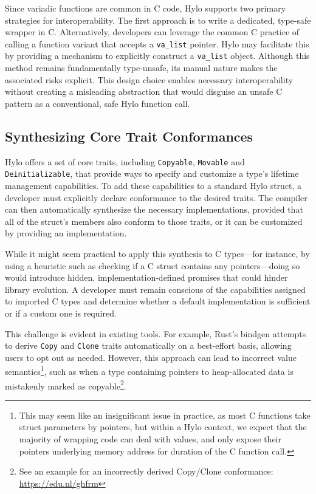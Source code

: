 Since variadic functions are common in C code, Hylo supports two primary strategies for interoperability. The first approach is to write a dedicated, type-safe wrapper in C. Alternatively, developers can leverage the common C practice of calling a function variant that accepts a \texttt{va\_list} pointer\cite{wrapping-valist}. Hylo may facilitate this by providing a mechanism to explicitly construct a \texttt{va\_list} object\cite{swift-variadic-ffi}. Although this method remains fundamentally type-unsafe, its manual nature makes the associated risks explicit. This design choice enables necessary interoperability without creating a misleading abstraction that would disguise an unsafe C pattern as a conventional, safe Hylo function call.

\subsection{Synthesizing Core Trait Conformances}

Hylo offers a set of core traits, including \texttt{Copyable}, \texttt{Movable} and \texttt{Deinitializable}, that provide ways to specify and customize a type's lifetime management capabilities. To add these capabilities to a standard Hylo struct, a developer must explicitly declare conformance to the desired traits. The compiler can then automatically synthesize the necessary implementations, provided that all of the struct's members also conform to those traits, or it can be customized by providing an implementation.

While it might seem practical to apply this synthesis to C types—for instance, by using a heuristic such as checking if a C struct contains any pointers—doing so would introduce hidden, implementation-defined promises that could hinder library evolution. A developer must remain conscious of the capabilities assigned to imported C types and determine whether a default implementation is sufficient or if a custom one is required.

This challenge is evident in existing tools. For example, Rust's bindgen attempts to derive \texttt{Copy} and \texttt{Clone} traits automatically on a best-effort basis, allowing users to opt out as needed\cite{bindgen-nocopy}. However, this approach can lead to incorrect value semantics\footnote{This may seem like an insignificant issue in practice, as most C functions take struct parameters by pointers, but within a Hylo context, we expect that the majority of wrapping code can deal with values, and only expose their pointers underlying memory address for duration of the C function call.}, such as when a type containing pointers to heap-allocated data is mistakenly marked as copyable\footnote{See an example for an incorrectly derived Copy/Clone conformance: \url{https://edu.nl/ghfrm}}.

